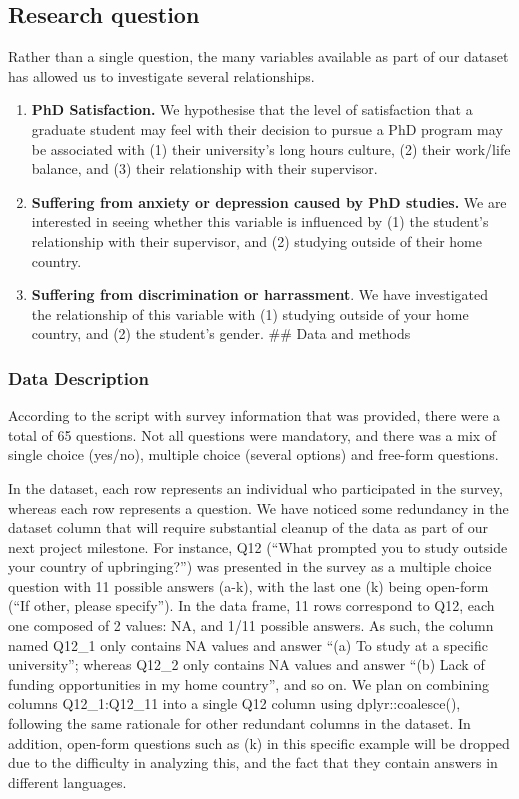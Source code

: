 \documentclass[
]{article}
\begin{document}
\hypertarget{research-question}{%
\subsection{Research question}\label{research-question}}

Rather than a single question, the many variables available as part of
our dataset has allowed us to investigate several relationships.

\begin{enumerate}
\def\labelenumi{\arabic{enumi}.}
\item
  \textbf{PhD Satisfaction.} We hypothesise that the level of
  satisfaction that a graduate student may feel with their decision to
  pursue a PhD program may be associated with (1) their university's
  long hours culture, (2) their work/life balance, and (3) their
  relationship with their supervisor.
\item
  \textbf{Suffering from anxiety or depression caused by PhD studies.}
  We are interested in seeing whether this variable is influenced by (1)
  the student's relationship with their supervisor, and (2) studying
  outside of their home country.
\item
  \textbf{Suffering from discrimination or harrassment}. We have
  investigated the relationship of this variable with (1) studying
  outside of your home country, and (2) the student's gender. \#\# Data
  and methods
\end{enumerate}

\hypertarget{data-description}{%
\subsubsection{Data Description}\label{data-description}}

According to the script with survey information that was provided, there
were a total of 65 questions. Not all questions were mandatory, and
there was a mix of single choice (yes/no), multiple choice (several
options) and free-form questions.

In the dataset, each row represents an individual who participated in
the survey, whereas each row represents a question. We have noticed some
redundancy in the dataset column that will require substantial cleanup
of the data as part of our next project milestone. For instance, Q12
(``What prompted you to study outside your country of upbringing?'') was
presented in the survey as a multiple choice question with 11 possible
answers (a-k), with the last one (k) being open-form (``If other, please
specify''). In the data frame, 11 rows correspond to Q12, each one
composed of 2 values: NA, and 1/11 possible answers. As such, the column
named Q12\_1 only contains NA values and answer ``(a) To study at a
specific university''; whereas Q12\_2 only contains NA values and answer
``(b) Lack of funding opportunities in my home country'', and so on. We
plan on combining columns Q12\_1:Q12\_11 into a single Q12 column using
dplyr::coalesce(), following the same rationale for other redundant
columns in the dataset. In addition, open-form questions such as (k) in
this specific example will be dropped due to the difficulty in analyzing
this, and the fact that they contain answers in different languages.
\end{document}
